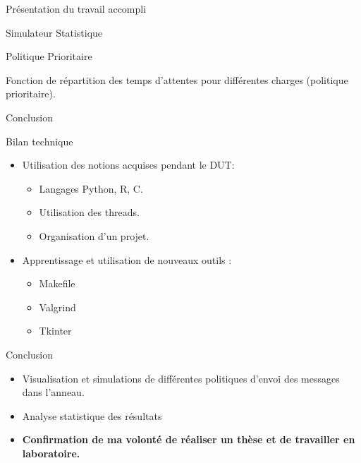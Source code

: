 \documentclass[10 pt]{beamer}
\begin{document}
\begin{section}{Pr\'esentation du travail accompli}
\begin{subsection}{Simulateur Statistique}
\begin{frame}{Politique Prioritaire}
\begin{center}
Fonction de r\'epartition des temps d'attentes pour diff\'erentes charges (politique prioritaire).
\end{center}
\end{frame}
\end{subsection}



\end{section}

\begin{section}{Conclusion}

\begin{frame}{Bilan technique}
 \begin{multicols}{2}
\begin{itemize}
\item Utilisation des notions acquises pendant le DUT:
\begin{itemize}
\vspace{0,2cm}
\item Langages Python, R, C.
\item Utilisation des threads.
\item Organisation d'un projet.
\end{itemize}

\item Apprentissage et utilisation de nouveaux outils :
\begin{itemize}
\item Makefile
\item Valgrind
\item Tkinter
\end{itemize}

\end{itemize}

\end{multicols}
\end{frame}


\begin{frame}{Conclusion}

\begin{itemize}
\item Visualisation et simulations de diff\'erentes politiques d'envoi des messages dans l'anneau.
\item Analyse statistique des r\'esultats
\vspace{1cm}
\item {\bf Confirmation de ma volont\'e de r\'ealiser un th\`ese et de travailler en laboratoire.}


\end{itemize}
\end{frame}
\end{section}
\end{document}
